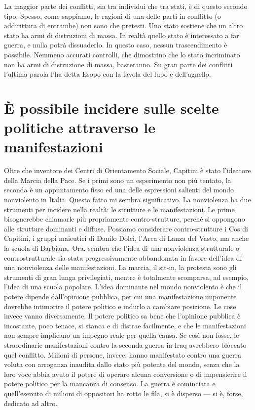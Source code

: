 \documentclass[12pt,oneside,openany]{book}
\begin{document}
La maggior parte dei conflitti, sia tra individui che tra stati, è di questo secondo tipo. Spesso, come sappiamo, le ragioni di una delle parti in conflitto (o addirittura di entrambe) non sono che pretesti. Uno stato sostiene che un altro stato ha armi di distruzioni di massa. In realtà quello stato è interessato a far guerra, e nulla potrà dissuaderlo. In questo caso, nessun trascendimento è possibile. Nemmeno accurati controlli, che dimostrino che lo stato incriminato non ha armi di distruzione di massa, basteranno. Su gran parte dei conflitti l'ultima parola l'ha detta Esopo con la favola del lupo e dell'agnello.

\setcounter{chapter}{9}\addtocounter{chapter}{-1}

\chapter{È possibile incidere sulle scelte politiche attraverso le manifestazioni}

Oltre che inventore dei Centri di Orientamento Sociale, Capitini è stato l'ideatore della Marcia della Pace. Se i primi sono un esperimento non più tentato, la seconda è un appuntamento fisso ed una delle espressioni salienti del mondo nonviolento in Italia. Questo fatto mi sembra significativo. La nonviolenza ha due strumenti per incidere nella realtà: le strutture e le manifestazioni. Le prime bisognerebbe chiamarle più propriamente contro-strutture, perché si oppongono alle strutture dominanti e diffuse. Possiamo considerare contro-strutture i Cos di Capitini, i gruppi maieutici di Danilo Dolci, l'Arca di Lanza del Vasto, ma anche la scuola di Barbiana. Ora, sembra che l'idea di una nonviolenza strutturale o controstrutturale sia stata progressivamente abbandonata in favore dell'idea di una nonviolenza delle manifestazioni. La marcia, il sit-in, la protesta sono gli strumenti di gran lunga privilegiati, mentre è totalmente scomparsa, ad esempio, l'idea di una scuola popolare. L'idea dominante nel mondo nonviolento è che il potere dipende dall'opinione pubblica, per cui una manifestazione imponente dovrebbe intimorire il potere politico e indurlo a cambiare posizione. Le cose invece vanno diversamente. Il potere politico sa bene che l'opinione pubblica è incostante, poco tenace, si stanca e di distrae facilmente, e che le manifestazioni non sempre implicano un impegno reale per quella causa. Se così non fosse, le straordinarie manifestazioni contro la seconda guerra in Iraq avrebbero bloccato quel conflitto. Milioni di persone, invece, hanno manifestato contro una guerra voluta con arroganza inaudita dallo stato più potente del mondo, senza che la loro voce abbia avuto il potere di operare alcuna conversione o di impensierire il potere politico per la mancanza di consenso. La guerra è cominciata e quell'esercito di milioni di oppositori ha rotto le fila, si è disperso --- si è, forse, dedicato ad altro.
\end{document}
